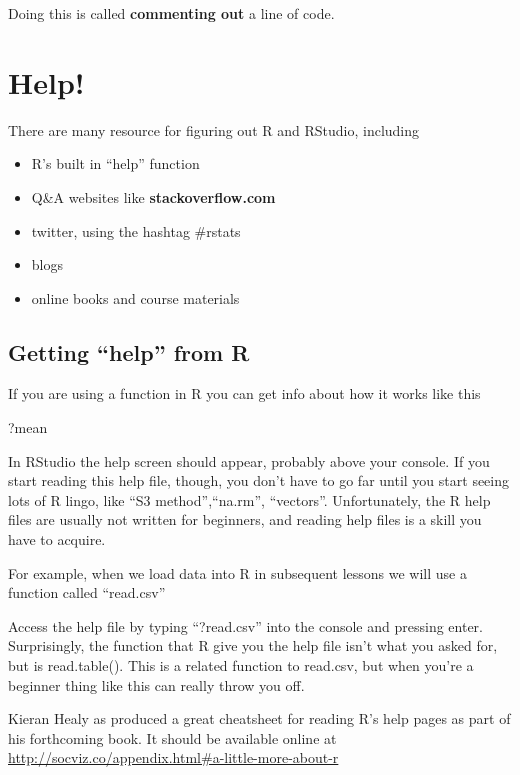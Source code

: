 \documentclass[
]{book}
\newenvironment{Shaded}{\begin{snugshade}}{\end{snugshade}}
\newcommand{\NormalTok}[1]{#1}
\providecommand{\tightlist}{%
  \setlength{\itemsep}{0pt}\setlength{\parskip}{0pt}}
\begin{document}
Doing this is called \textbf{commenting out} a line of code.

\hypertarget{help}{%
\section{Help!}\label{help}}

There are many resource for figuring out R and RStudio, including

\begin{itemize}
\tightlist
\item
  R's built in ``help'' function
\item
  Q\&A websites like \textbf{stackoverflow.com}
\item
  twitter, using the hashtag \#rstats
\item
  blogs
\item
  online books and course materials
\end{itemize}

\hypertarget{getting-help-from-r}{%
\subsection{Getting ``help'' from R}\label{getting-help-from-r}}

If you are using a function in R you can get info about how it works like this

\begin{Shaded}
\begin{Highlighting}[]
\NormalTok{?mean}
\end{Highlighting}
\end{Shaded}

In RStudio the help screen should appear, probably above your console. If you start reading this help file, though, you don't have to go far until you start seeing lots of R lingo, like ``S3 method'',``na.rm'', ``vectors''. Unfortunately, the R help files are usually not written for beginners, and reading help files is a skill you have to acquire.

For example, when we load data into R in subsequent lessons we will use a function called ``read.csv''

Access the help file by typing ``?read.csv'' into the console and pressing enter. Surprisingly, the function that R give you the help file isn't what you asked for, but is read.table(). This is a related function to read.csv, but when you're a beginner thing like this can really throw you off.

Kieran Healy as produced a great cheatsheet for reading R's help pages as part of his forthcoming book. It should be available online at \url{http://socviz.co/appendix.html\#a-little-more-about-r}
\end{document}
